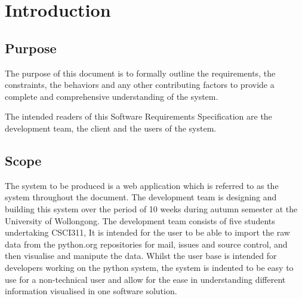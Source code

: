 
\chapter{Introduction} %

\label{Part7Chapter1} %



\section{Purpose}

The purpose of this document is to formally outline the requirements, the constraints, the behaviors and any other contributing factors to provide a complete and comprehensive understanding of the system.

The intended readers of this Software Requirements Specification are the development team, the client and the users of the system.


\section{Scope}

The system to be produced is a web application which is referred to as the system throughout the document. The development team is designing and building this system over the period of 10 weeks during autumn semester at the University of Wollongong. The development team consists of five students undertaking CSCI311, It is intended for the user to be able to import the raw data from the python.org repositories for mail, issues and source control, and then visualise and manipute the data. Whilst the user base is intended for developers working on the python system, the system is indented to be easy to use for a non-technical user and allow for the ease in understanding different information visualised in one software solution.

